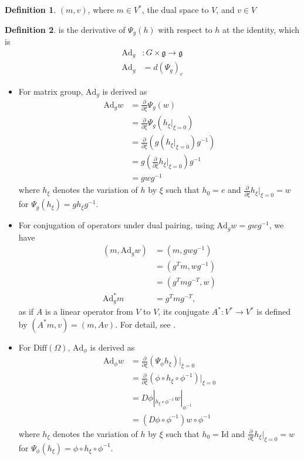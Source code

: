 \documentclass[a4paper]{article}
\theoremstyle{definition}
\newtheorem{definition}{Definition}
\theoremstyle{plain}
\begin{document}
\begin{definition}
 $(m,v)$, where $m\in V^*$, the dual space to $V$, and $v\in V$
\end{definition}

\begin{definition}
 is the derivative of $\Psi_g(h)$ with respect to $h$ at the identity, which is
\begin{align*}
    \mathrm{Ad}_g&:G\times\mathfrak{g}\rightarrow\mathfrak{g}\\
    \mathrm{Ad}_g&=d(\Psi_g)_e
\end{align*}
\end{definition}

\begin{itemize}
    \item For matrix group, $\mathrm{Ad}_g$ is derived as
    \begin{align*}
        \mathrm{Ad}_gw&=\frac{\partial}{\partial\xi}\Psi_g(w)\\
        &=\frac{\partial}{\partial\xi}\Psi_g(h_\xi|_{\xi=0})\\
        &=\frac{\partial}{\partial\xi}\left(g(h_\xi|_{\xi=0})g^{-1}\right)\\
        &=g\left(\frac{\partial}{\partial\xi}h_\xi|_{\xi=0}\right)g^{-1}\\
        &=gwg^{-1}
    \end{align*}
    where $h_\xi$ denotes the variation of $h$ by $\xi$ such that $h_0=e$ and $\frac{\partial}{\partial\xi}h_\xi|_{\xi=0}=w$ for $\Psi_g(h_\xi)=gh_\xi g^{-1}$.
    
    \item For conjugation of operators under dual pairing, using $\mathrm{Ad}_gw=gwg^{-1}$, we have
    \begin{align*}
        (m,\mathrm{Ad}_gw)&=(m,gwg^{-1})\\
        &=(g^Tm,wg^{-1})\\
        &=(g^Tmg^{-T},w)\\
        \mathrm{Ad}^*_gm&=g^Tmg^{-T},
    \end{align*}
    as if $A$ is a linear operator from $V$ to $V$, its conjugate $A^*:V^*\rightarrow V^*$ is defined by $(A^*m,v)=(m,Av)$. For detail, see  \cite{singh}.
    
    \item For $\mathrm{Diff}(\Omega)$, $\mathrm{Ad}_\phi$ is derived as
    \begin{align*}
        \mathrm{Ad}_\phi w&=\frac{\partial}{\partial\xi}(\Psi_\phi h_\xi)|_{\xi=0}\\
        &=\frac{\partial}{\partial\xi}(\phi\circ h_\xi\circ\phi^{-1})|_{\xi=0}\\
        &=D\phi|_{h_\xi\circ\phi^{-1}}w|_{\phi^{-1}}\\
        &=(D\phi\circ\phi^{-1})w\circ\phi^{-1}
    \end{align*}
    where $h_\xi$ denotes the variation of $h$ by $\xi$ such that $h_0=\mathrm{Id}$ and $\frac{\partial}{\partial\xi}h_\xi|_{\xi=0}=w$ for $\Psi_\phi(h_\xi)=\phi\circ h_\xi \circ\phi^{-1}$.
\end{itemize}
\end{document}
